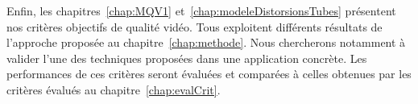 Enfin, les chapitres~\ref{chap:MQV1} et~\ref{chap:modeleDistorsionsTubes} présentent nos critères objectifs de qualité vidéo. Tous exploitent différents résultats de l'approche proposée au chapitre~\ref{chap:methode}. Nous chercherons notamment à valider l'une des techniques proposées dans une application concrète. Les performances de ces critères seront évaluées et comparées à celles obtenues par les critères évalués au chapitre~\ref{chap:evalCrit}.


